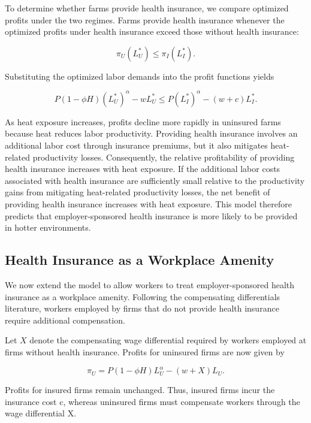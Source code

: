 \documentclass[12pt]{article}
\begin{document}
To determine whether farms provide health insurance, we compare optimized profits under the two regimes. Farms provide health insurance whenever the optimized profits under health insurance exceed those without health insurance:

\begin{equation}
\pi_U(L_U^*)
\le
\pi_I(L_I^*).
\end{equation}

Substituting the optimized labor demands into the profit functions yields

\begin{equation}
P(1-\phi H)(L_U^*)^{\alpha}
-
wL_U^*
\le
P(L_I^*)^{\alpha}
-
(w+c)L_I^*.
\end{equation}

As heat exposure increases, profits decline more rapidly in uninsured farms because heat reduces labor productivity. Providing health insurance involves an additional labor cost through insurance premiums, but it also mitigates heat-related productivity losses. Consequently, the relative profitability of providing health insurance increases with heat exposure. If the additional labor costs associated with health insurance are sufficiently small relative to the productivity gains from mitigating heat-related productivity losses, the net benefit of providing health insurance increases with heat exposure. This model therefore predicts that employer-sponsored health insurance is more likely to be provided in hotter environments.

\subsection{Health Insurance as a Workplace Amenity}

We now extend the model to allow workers to treat employer-sponsored health insurance as a workplace amenity. Following the compensating differentials literature, workers employed by firms that do not provide health insurance require additional compensation.

Let $X$ denote the compensating wage differential required by workers employed at firms without health insurance. Profits for uninsured firms are now given by

\begin{equation}
\pi_U
=
P(1-\phi H)L_U^{\alpha}
-
(w+X)L_U.
\end{equation}

Profits for insured firms remain unchanged. Thus, insured firms incur the insurance cost c, whereas uninsured firms must compensate workers through the wage differential X.
\end{document}
